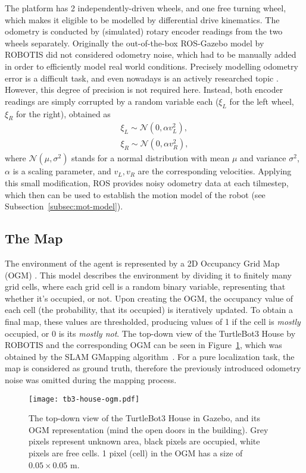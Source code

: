 The platform has 2 independently-driven wheels, and one free turning wheel, which
makes it eligible to be modelled by differential drive kinematics.
The odometry is conducted by (simulated) rotary encoder readings from the two wheels separately.
Originally the out-of-the-box ROS-Gazebo model by ROBOTIS did not considered odometry noise,
which had to be manually added in order to efficiently model real world conditions.
Precisely modelling odometry error is a difficult task, and even nowadays is an actively researched topic \cite{Fazekas2021}.
However, this degree of precision is not required here.
Instead, both encoder readings are simply corrupted by a random variable each  ($\xi_L$ for the left wheel, $\xi_R$ for the right), obtained as
\begin{align}
    \xi_L \sim \mathcal{N}(0,\alpha v_L^{2}), \\
    \xi_R \sim \mathcal{N}(0,\alpha v_R^{2}),
\end{align}
where $\mathcal{N}(\mu,\sigma^{2})$ stands for a normal distribution with mean $\mu$ and variance $\sigma^{2}$,
$\alpha$ is a scaling parameter, and $v_L, v_R$ are the corresponding velocities. Applying this small modification,
ROS provides noisy odometry data at each tilmestep, which then can be used to establish the motion model of the robot (see Subsection~\ref{subsec:mot-model}).

\subsection{The Map}
The environment of the agent is represented by a 2D Occupancy Grid Map (OGM) \cite{Moravec1985}.
This model describes the environment by dividing it to finitely many grid cells, where each grid cell is a random binary variable,
representing that whether it’s occupied, or not.
Upon creating the OGM, the occupancy value of each cell (the probability, that its occupied) is iteratively updated.
To obtain a final map, these values are thresholded, producing values of 1 if the cell is \emph{mostly} occupied,
or 0 is its \emph{mostly not}.
The top-down view of the TurtleBot3 House by ROBOTIS and the corresponding OGM can be seen in Figure~\ref{fig:tb3-house-ogm},
which was obtained by the SLAM GMapping algorithm~\cite{Grisetti2007}.
For a pure localization task, the map is considered as ground truth,
therefore the previously introduced odometry noise was omitted during the mapping process.
\begin{figure}[htbp]
    \centering
    \texttt{[image: tb3-house-ogm.pdf]}
    \caption{The top-down view of the TurtleBot3 House in Gazebo, and its OGM representation (mind the open doors in the building).
        Grey pixels represent unknown area, black pixels are occupied, white pixels are free cells.
        1 pixel (cell) in the OGM has a size of $0.05 \times 0.05$ m. }
    \label{fig:tb3-house-ogm}
\end{figure}
